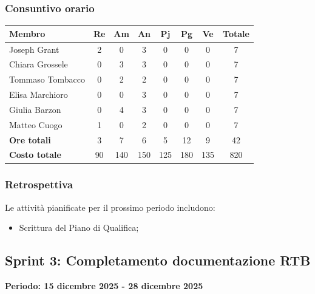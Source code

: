 \documentclass[11pt,a4paper]{article}
\begin{document}
\subsubsection{Consuntivo orario}
\begin{center}
    \begin{tabular}{|l|c|c|c|c|c|c|c|}
        \hline
        \textbf{Membro} & \textbf{Re} & \textbf{Am} & \textbf{An} & \textbf{Pj} & \textbf{Pg} & \textbf{Ve} & \textbf{Totale} \\
        \hline
        Joseph Grant & 2 & 0 & 3 & 0 & 0 & 0 & 7 \\
        \hline
        Chiara Grossele & 0 & 3 & 3 & 0 & 0 & 0 & 7 \\
        \hline
        Tommaso Tombacco & 0 & 2 & 2 & 0 & 0 & 0 & 7 \\
        \hline
        Elisa Marchioro & 0 & 0 & 3 & 0 & 0 & 0 & 7 \\
        \hline
        Giulia Barzon & 0 & 4 & 3 & 0 & 0 & 0 & 7 \\
        \hline
        Matteo Cuogo & 1 & 0 & 2 & 0 & 0 & 0 & 7 \\
        \hline
        \textbf{Ore totali} & 3 & 7 & 6 & 5 & 12 & 9 & 42 \\
        \hline
        \textbf{Costo totale} & 90 & 140 & 150 & 125 & 180 & 135 & 820 \\
        \hline
    \end{tabular}
\end{center}

\subsubsection{Retrospettiva}
Le attività pianificate per il prossimo periodo includono:
\begin{itemize}
    \item Scrittura del Piano di Qualifica;
\end{itemize}

\newpage
\subsection{Sprint 3: Completamento documentazione RTB}
{\textbf{Periodo: 15 dicembre 2025 - 28 dicembre 2025}\par}
\end{document}
